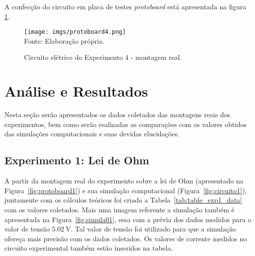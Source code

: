\documentclass[a4paper,pra,aps,twocolumn,superscriptaddress,10pt,final]{revtex4-2}
\begin{document}
    A confecção do circuito em placa de testes \emph{protoboard} está apresentada na figura \ref{fig:protoboard4}.

    \begin{figure}[H]
        \centering
        \caption{Circuito elétrico do Experimento 4 - montagem real.}
        \texttt{[image: imgs/protoboard4.png]}\\
        \scriptsize{Fonte: Elaboração própria.}
        \label{fig:protoboard4}
    \end{figure}

\section{Análise e Resultados}
\label{sec:analise_resultados}

    Nesta seção serão apresentados os dados coletados das montagens reais dos experimentos, bem como serão realizadas as comparações com os valores obtidos das simulações computacionais e suas devidas elucidações.
    
\subsection{Experimento 1: Lei de Ohm}
\label{subsec:ana_exp1}

    A partir da montagem real do experimento sobre a lei de Ohm (apresentado na Figura~\ref{fig:protoboard1}) e sua simulação computacional (Figura~\ref{fig:circuito1}), juntamente com os cálculos teóricos foi criada a Tabela~\ref{tab:table_exp1_data} com os valores coletados. Mais uma imagem referente a simulação também é apresentada na Figura~\ref{fig:simula01}, essa com a prévia dos dados medidos para o valor de tensão $\qty{5,02}{\volt}$. Tal valor de tensão foi utilizado para que a simulação ofereça mais precisão com os dados coletados. Os valores de corrente medidos no circuito experimental também estão inseridos na tabela.
\end{document}
